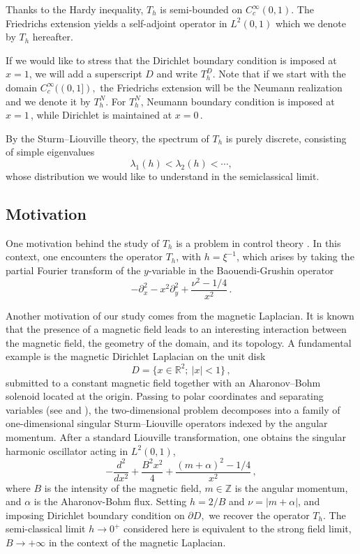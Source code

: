 \documentclass[11pt]{amsart}
\numberwithin{equation}{section}
\theoremstyle{remark}
\begin{document}
Thanks to the Hardy inequality, $T_h$ is semi-bounded on $C_c^\infty(0,1)$. The Friedrichs extension yields a self-adjoint operator in $L^2(0,1)$ which we denote by $T_h$ hereafter. 

If we would like to stress that the Dirichlet boundary condition is imposed at $x=1$, we will add a superscript $D$ and write $T_h^D$. Note that if we start with the domain $C_c^\infty((0,1]),$ the Friedrichs extension will be the Neumann realization and we denote it by $T_h^N$. For $T_h^N$, Neumann boundary condition is imposed at $x=1\,$, while Dirichlet is maintained at $x=0\,$.

By the Sturm--Liouville theory, the spectrum of $T_h$ is purely discrete,
consisting of simple eigenvalues
\[
\lambda_1(h)<\lambda_2(h)<\cdots,
\]
whose distribution we would like to understand in the semiclassical
limit.








\subsection{Motivation} One motivation behind the study of $T_h$ is a problem in control theory \cite{Vanlaere2, BMM}. In this context, one encounters the operator $T_h$, with $h=\xi^{-1}$,  which arises by taking the partial Fourier transform of the $y$-variable in the Baouendi-Grushin operator
\[-\partial_x^2-x^2\partial_y^2+\frac{\nu^2-1/4}{ x^2}\,.\]

Another  motivation of our study comes from the magnetic Laplacian. It is known that the presence of a magnetic field leads to an interesting interaction between the magnetic field,
the geometry of the domain, and its topology. A fundamental example is the magnetic Dirichlet Laplacian on the
unit disk
\begin{equation}\label{disk}
D=\{x\in\mathbb R^2;\ |x|<1\}\,,
\end{equation}
submitted to a constant magnetic field together with an
Aharonov--Bohm solenoid located at the origin. Passing to polar
coordinates and separating variables (see \cite{HL} and \cite[Section~1.3]{Vanlaere}), the two-dimensional problem
decomposes into a family of one-dimensional singular
Sturm--Liouville operators indexed by the angular momentum. After  a standard Liouville transformation, one obtains the singular harmonic oscillator acting in $L^2(0,1)$,
\[-\frac{d^2}{dx^2} + \frac{B^2x^2}{4} + \frac{(m+\alpha)^2 - 1/4}{x^2}\,,\]
where $B$ is the intensity of the magnetic field, $m\in\mathbb Z$ is the angular momentum, and $\alpha$ is the Aharonov-Bohm flux.
%
Setting $h=2/B$ and $ \nu=|m+\alpha|$, and imposing Dirichlet boundary condition on $\partial D,$ we recover the operator $T_h$. The semi-classical limit $h\to0^+$ considered here is equivalent to the strong field limit, $B\to+\infty$ in the context of the magnetic Laplacian. 
%
%
%
\end{document}
